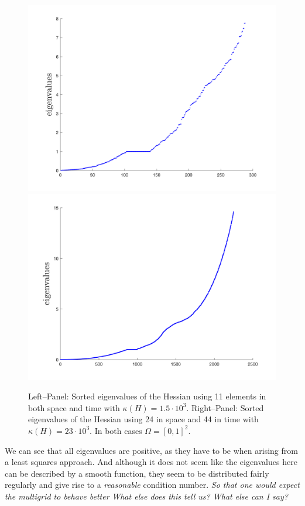 \documentclass[../draft_1.tex]{subfiles}
\begin{document}
\begin{figure}[ht!]
	\centering
	\includegraphics[scale=0.4]{images/implementation/eigenvalues/eigenvalues_11by11elem}
	\includegraphics[scale=0.4]{images/implementation/eigenvalues/eigenvalues_24by44elem}
	\caption{Left--Panel: Sorted eigenvalues of the Hessian using 11 elements in both space and time with $\kappa(H)=1.5\cdot10^3$. Right--Panel:   Sorted eigenvalues of the Hessian using 24 in space and 44 in time  with $\kappa(H)=23\cdot10^3$. In both cases $\Omega = [0,1]^2$.}
\end{figure}

We can see that all eigenvalues are positive, as they have to be when arising from a least squares approach. And although it does not seem like the eigenvalues here can be described by a smooth function, they seem to be distributed fairly regularly and give rise to a \textit{reasonable} condition number. \textit{So that one would expect the multigrid to behave better}
\textit{What else does this tell us? What else can I say?}
\end{document}
